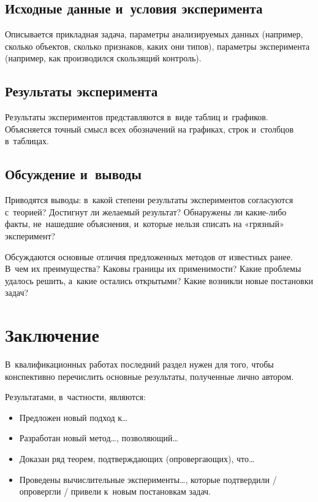 \documentclass[12pt,fleqn]{article}
\begin{document}
\subsection{Исходные данные и~условия эксперимента}
Описывается прикладная задача, параметры анализируемых данных 
(например, сколько объектов, сколько признаков, каких они типов), 
параметры эксперимента 
(например, как производился скользящий контроль). 

\subsection{Результаты эксперимента}
Результаты экспериментов представляются в~виде таблиц и~графиков. 
Объясняется точный смысл всех обозначений на графиках, строк и~столбцов в~таблицах. 

\subsection{Обсуждение и~выводы}
Приводятся выводы: 
в~какой степени результаты экспериментов согласуются с~теорией? 
Достигнут ли желаемый результат? 
Обнаружены ли какие-либо факты, не~нашедшие объяснения, и~которые нельзя списать на «грязный» эксперимент?

Обсуждаются основные отличия предложенных методов от известных ранее. 
В~чем их преимущества? 
Каковы границы их применимости? 
Какие проблемы удалось решить, а~какие остались открытыми? 
Какие возникли новые постановки задач?

\section{Заключение}

В~квалификационных работах последний раздел нужен для того, чтобы 
конспективно перечислить основные результаты, полученные лично автором. 

Результатами, в~частности, являются:
\begin{itemize}
\item 
    Предложен новый подход к\dots
\item 
    Разработан новый метод\dots, позволяющий\dots
\item 
    Доказан ряд теорем, подтверждающих (опровергающих), что\dots
\item 
    Проведены вычислительные эксперименты\dots,
    которые подтвердили / опровергли / привели к~новым постановкам задач.
\end{itemize}
    
\end{document}
